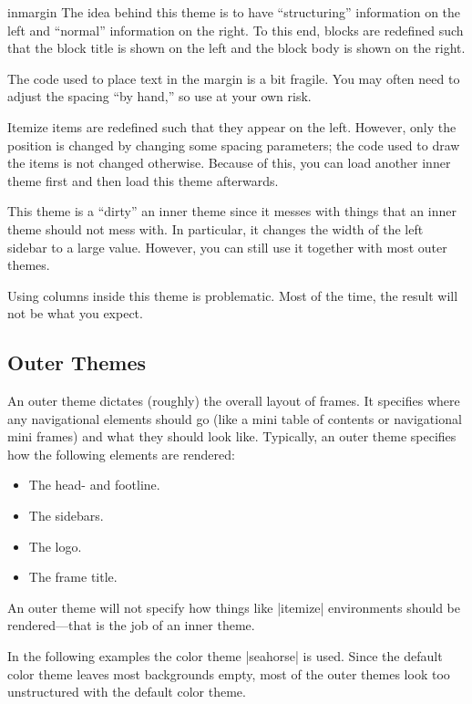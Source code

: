 \begin{innerthemeexample}{inmargin}
  The idea behind this theme is to have ``structuring'' information on
  the left and ``normal'' information on the right. To this end,
  blocks are redefined such that the block title is shown on the left
  and the block body is shown on the right.

  The code used to place text in the margin is a bit fragile. You may
  often need to adjust the spacing ``by hand,'' so use at your own risk.

  Itemize items are redefined such that they appear on the
  left. However, only the position is changed by changing some spacing
  parameters; the code used to draw the items is not changed
  otherwise. Because of this, you can load another inner theme first
  and then load this theme afterwards.

  This theme is a ``dirty'' an inner theme since it messes with things
  that an inner theme should not mess with. In particular, it changes
  the width of the left sidebar to a large value. However, you can
  still use it together with most outer themes.

  Using columns inside this theme is problematic. Most of the time,
  the result will not be what you expect.
\end{innerthemeexample}




\subsection{Outer Themes}

An outer theme dictates (roughly) the overall layout of frames. It
specifies where any navigational elements should go (like a mini table
of contents or navigational mini frames) and what they should look
like. Typically, an outer theme specifies how the following elements
are rendered:
\begin{itemize}
\item The head- and footline.
\item The sidebars.
\item The logo.
\item The frame title.
\end{itemize}

An outer theme will not specify how things like |itemize| environments
should be rendered---that is the job of an inner theme.

In the following examples the color theme |seahorse| is
used. Since the default color theme leaves most backgrounds empty,
most of the outer themes look too unstructured with the default
color theme.


